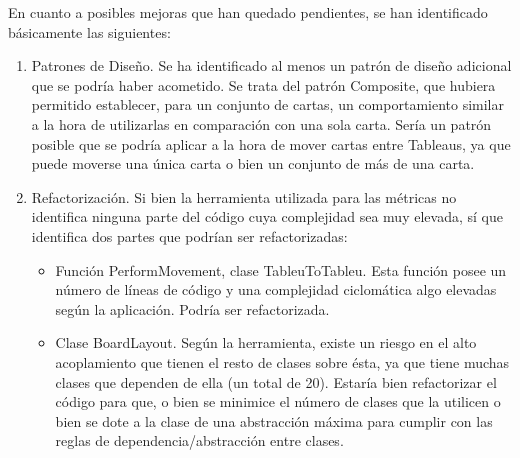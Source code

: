 \documentclass[11pt]{article}
\begin{document}
En cuanto a posibles mejoras que han quedado pendientes, se han identificado básicamente las siguientes:

\begin{enumerate}
\item{Patrones de Diseño}. Se ha identificado al menos un patrón de diseño adicional que se podría haber acometido. Se trata del patrón Composite, que hubiera permitido establecer, para un conjunto de cartas, un comportamiento similar a la hora de utilizarlas en comparación con una sola carta. Sería un patrón posible que se podría aplicar a la hora de mover cartas entre Tableaus, ya que puede moverse una única carta o bien un conjunto de más de una carta.
\item{Refactorización}. Si bien la herramienta utilizada para las métricas no identifica ninguna parte del código cuya complejidad sea muy elevada, sí que identifica dos partes que podrían ser refactorizadas:
\begin{itemize}
\item{Función PerformMovement, clase TableuToTableu}. Esta función posee un número de líneas de código y una complejidad ciclomática algo elevadas según la aplicación. Podría ser refactorizada.
\item{Clase BoardLayout}. Según la herramienta, existe un riesgo en el alto acoplamiento que tienen el resto de clases sobre ésta, ya que tiene muchas clases que dependen de ella (un total de 20). Estaría bien refactorizar el código para que, o bien se minimice el número de clases que la utilicen o bien se dote a la clase de una abstracción máxima para cumplir con las reglas de dependencia/abstracción entre clases.
\end{itemize}
\end{enumerate}
\pagebreak
\end{document}
